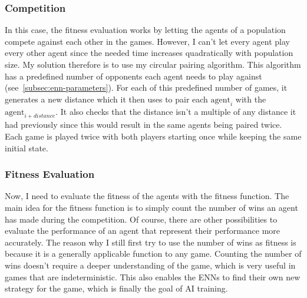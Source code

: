 \documentclass[11pt]{report}
\begin{document}
\begin{enumerate}
    \subsubsection{Competition}
    In this case, the fitness evaluation works by letting the agents of a population compete against each other in the games.
    However, I can't let every agent play every other agent since the needed time increases quadratically with population size.
    My solution therefore is to use my circular pairing algorithm.
    This algorithm has a predefined number of opponents each agent needs to play against (see~\ref{subsec:enn-parameters}).
    For each of this predefined number of games, it generates a new distance which it then uses to pair each $\textrm{agent}_i$ with the $\textrm{agent}_{i+distance}$.
    It also checks that the distance isn't a multiple of any distance it had previously since this would result in the same agents being paired twice.
    Each game is played twice with both players starting once while keeping the same initial state.

    \subsubsection{Fitness Evaluation}
    Now, I need to evaluate the fitness of the agents with the fitness function.
    The main idea for the fitness function is to simply count the number of wins an agent has made during the competition.
    Of course, there are other possibilities to evaluate the performance of an agent that represent their performance more accurately.
    The reason why I still first try to use the number of wins as fitness is because it is a generally applicable function to any game.
    Counting the number of wins doesn't require a deeper understanding of the game, which is very useful in games that are indeterministic.
    This also enables the ENNs to find their own new strategy for the game, which is finally the goal of AI training.


\end{enumerate}
\end{document}
